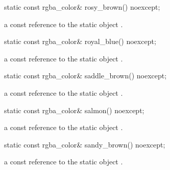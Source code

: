 \begin{itemdecl}
static const rgba_color& rosy_brown() noexcept;
\end{itemdecl}
\begin{itemdescr}
\pnum
\returns
a const reference to the static  object .
\end{itemdescr}

\begin{itemdecl}
static const rgba_color& royal_blue() noexcept;
\end{itemdecl}
\begin{itemdescr}
\pnum
\returns
a const reference to the static  object .
\end{itemdescr}

\begin{itemdecl}
static const rgba_color& saddle_brown() noexcept;
\end{itemdecl}
\begin{itemdescr}
\pnum
\returns
a const reference to the static  object .
\end{itemdescr}

\begin{itemdecl}
static const rgba_color& salmon() noexcept;
\end{itemdecl}
\begin{itemdescr}
\pnum
\returns
a const reference to the static  object .
\end{itemdescr}

\begin{itemdecl}
static const rgba_color& sandy_brown() noexcept;
\end{itemdecl}
\begin{itemdescr}
\pnum
\returns
a const reference to the static  object .
\end{itemdescr}

